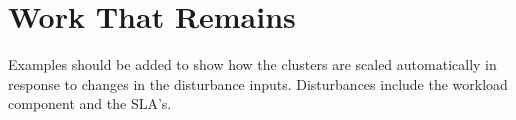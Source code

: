 %
%
%
%
%
%
%


 \section{Work That Remains}  
  Examples should be added to show how the clusters are scaled automatically in response to changes in the disturbance inputs.   Disturbances include the workload component  and the SLA's.
 


